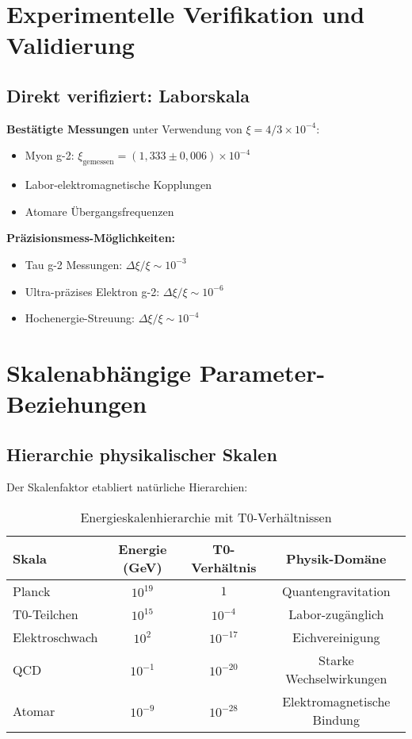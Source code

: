 \documentclass[12pt,a4paper]{report}
\begin{document}
	\section{Experimentelle Verifikation und Validierung}
	\label{sec:experimental_verification}
	
	\subsection{Direkt verifiziert: Laborskala}
	\label{subsec:directly_verified}
	
	\textbf{Bestätigte Messungen} unter Verwendung von $\xi = 4/3 \times 10^{-4}$:
	\begin{itemize}
		\item Myon g-2: $\xi_{\text{gemessen}} = (1,333 \pm 0,006) \times 10^{-4}$ \checkmark
		\item Labor-elektromagnetische Kopplungen \checkmark
		\item Atomare Übergangsfrequenzen \checkmark
	\end{itemize}
	
	\textbf{Präzisionsmess-Möglichkeiten:}
	\begin{itemize}
		\item Tau g-2 Messungen: $\Delta\xi/\xi \sim 10^{-3}$
		\item Ultra-präzises Elektron g-2: $\Delta\xi/\xi \sim 10^{-6}$
		\item Hochenergie-Streuung: $\Delta\xi/\xi \sim 10^{-4}$
	\end{itemize}
	
	\section{Skalenabhängige Parameter-Beziehungen}
	\label{sec:scale_dependent}
	
	\subsection{Hierarchie physikalischer Skalen}
	\label{subsec:hierarchy_scales}
	
	Der Skalenfaktor etabliert natürliche Hierarchien:
	
	\begin{table}[htbp]
		\centering
		\begin{tabular}{lccc}
			\toprule
			\textbf{Skala} & \textbf{Energie (GeV)} & \textbf{T0-Verhältnis} & \textbf{Physik-Domäne} \\
			\midrule
			Planck & $10^{19}$ & $1$ & Quantengravitation \\
			T0-Teilchen & $10^{15}$ & $10^{-4}$ & Labor-zugänglich \\
			Elektroschwach & $10^{2}$ & $10^{-17}$ & Eichvereinigung \\
			QCD & $10^{-1}$ & $10^{-20}$ & Starke Wechselwirkungen \\
			Atomar & $10^{-9}$ & $10^{-28}$ & Elektromagnetische Bindung \\
			\bottomrule
		\end{tabular}
		\caption{Energieskalenhierarchie mit T0-Verhältnissen}
		\label{tab:energy_hierarchy}
	\end{table}
	
\end{document}
